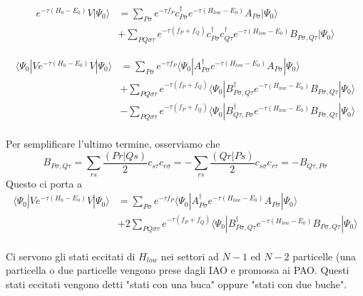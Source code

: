 \documentclass{report}
\begin{document}
\begin{equation}
\begin{split}
e^{-\tau (H_0 - E_0 )} V | \Psi_0 \rangle 
&= \sum_{P\sigma} e^{- \tau f_P} c^\dagger_{P\sigma} e^{-\tau (H_{low} - E_0 )} A_{P\sigma} | \Psi_0 \rangle \\
&+ \sum_{PQ\sigma\tau} e^{- \tau (f_P+f_Q)} c^\dagger_{P\sigma} c^\dagger_{Q\tau} e^{-\tau (H_{low} - E_0 )} B_{P\sigma,Q\tau} | \Psi_0 \rangle
\end{split}
\end{equation}

\begin{equation}
\begin{split}
\langle \Psi_0 | V e^{-\tau (H_0 - E_0 )} V | \Psi_0 \rangle 
&= \sum_{P\sigma} e^{- \tau f_P} 
\langle \Psi_0 | A_{P\sigma}^\dagger e^{-\tau (H_{low} - E_0 )} A_{P\sigma} | \Psi_0 \rangle \\
&+ \sum_{PQ\sigma\tau} e^{- \tau (f_P+f_Q)} 
\langle \Psi_0 | B_{P\sigma,Q\tau}^\dagger e^{-\tau (H_{low} - E_0 )} B_{P\sigma,Q\tau} | \Psi_0 \rangle \\
&- \sum_{PQ\sigma\tau} e^{- \tau (f_P+f_Q)} 
\langle \Psi_0 | B_{Q\tau,P\sigma}^\dagger e^{-\tau (H_{low} - E_0 )} B_{P\sigma,Q\tau} | \Psi_0 \rangle \\
\end{split}
\end{equation}

Per semplificare l'ultimo termine, osserviamo che 
\begin{equation}
B_{P\sigma,Q\tau} = \sum_{rs} \frac{(Pr|Qs)}{2} c_{s\tau} c_{r\sigma} = - \sum_{rs} \frac{(Qr|Ps)}{2} c_{s\sigma} c_{r\tau} = - 
B_{Q\tau,P\sigma}
\end{equation}
Questo ci porta a
\begin{equation}
\begin{split}
\langle \Psi_0 | V  e^{-\tau (H_0 - E_0 )} V | \Psi_0 \rangle 
&= \sum_{P\sigma} e^{- \tau f_P} 
\langle \Psi_0 | A_{P\sigma}^\dagger e^{-\tau (H_{low} - E_0 )} A_{P\sigma} | \Psi_0 \rangle \\
&+ 2 \sum_{PQ\sigma\tau} e^{- \tau (f_P+f_Q)} 
\langle \Psi_0 | B_{P\sigma,Q\tau}^\dagger e^{-\tau (H_{low} - E_0 )} B_{P\sigma,Q\tau} | \Psi_0 \rangle \\
\end{split}
\end{equation}

{\color{red}
Ci servono gli stati eccitati di $H_{low}$ nei settori ad $N-1$ ed $N-2$ particelle (una particella o due particelle vengono prese dagli IAO e promossa ai PAO.
Questi stati eccitati vengono detti "stati con una buca" oppure "stati con due buche".}
\end{document}
